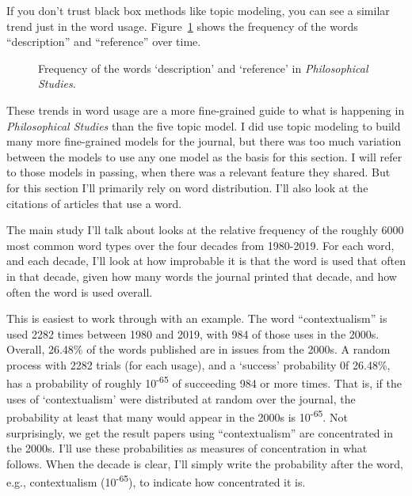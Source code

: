 \documentclass[
  10pt,
  letterpaper,
  DIV=11,
  numbers=noendperiod,
  twoside]{scrartcl}
\begin{document}
If you don't trust black box methods like topic modeling, you can see a
similar trend just in the word usage. Figure~\ref{fig-frege-russell}
shows the frequency of the words ``description'' and ``reference'' over
time.

\begin{figure}


\caption{\label{fig-frege-russell}Frequency of the words `description'
and `reference' in \emph{Philosophical Studies}.}

\end{figure}%

These trends in word usage are a more fine-grained guide to what is
happening in \emph{Philosophical Studies} than the five topic model. I
did use topic modeling to build many more fine-grained models for the
journal, but there was too much variation between the models to use any
one model as the basis for this section. I will refer to those models in
passing, when there was a relevant feature they shared. But for this
section I'll primarily rely on word distribution. I'll also look at the
citations of articles that use a word.

The main study I'll talk about looks at the relative frequency of the
roughly 6000 most common word types over the four decades from
1980-2019. For each word, and each decade, I'll look at how improbable
it is that the word is used that often in that decade, given how many
words the journal printed that decade, and how often the word is used
overall.

This is easiest to work through with an example. The word
``contextualism'' is used 2282 times between 1980 and 2019, with 984 of
those uses in the 2000s. Overall, 26.48\% of the words published are in
issues from the 2000s. A random process with 2282 trials (for each
usage), and a `success' probability 0f 26.48\%, has a probability of
roughly 10\textsuperscript{-65} of succeeding 984 or more times. That
is, if the uses of `contextualism' were distributed at random over the
journal, the probability at least that many would appear in the 2000s is
10\textsuperscript{-65}. Not surprisingly, we get the result papers
using ``contextualism'' are concentrated in the 2000s. I'll use these
probabilities as measures of concentration in what follows. When the
decade is clear, I'll simply write the probability after the word, e.g.,
contextualism (10\textsuperscript{-65}), to indicate how concentrated it
is.
\end{document}
